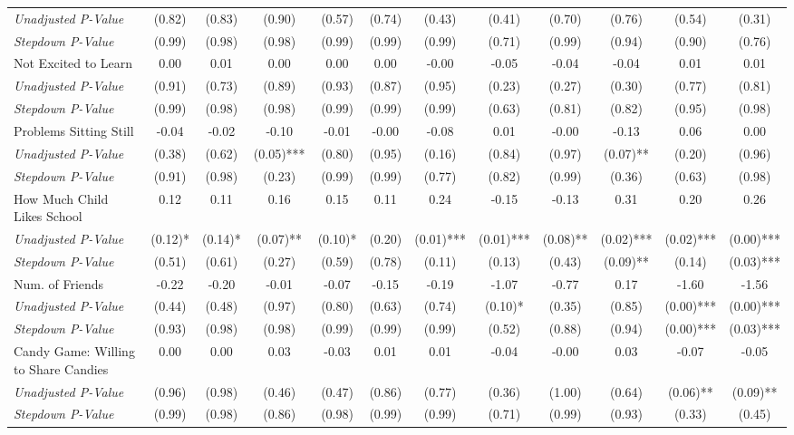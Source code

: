 \begin{tabular}{l c c c c c c c c c c c}
\quad \textit{Unadjusted P-Value} & (0.82) & (0.83) & (0.90) & (0.57) & (0.74) & (0.43) & (0.41) & (0.70) & (0.76) & (0.54) & (0.31) \\
\quad \textit{Stepdown P-Value} & (0.99) & (0.98) & (0.98) & (0.99) & (0.99) & (0.99) & (0.71) & (0.99) & (0.94) & (0.90) & (0.76) \\
Not Excited to Learn & 0.00 & 0.01 & 0.00 & 0.00 & 0.00 & -0.00 & -0.05 & -0.04 & -0.04 & 0.01 & 0.01 \\
\quad \textit{Unadjusted P-Value} & (0.91) & (0.73) & (0.89) & (0.93) & (0.87) & (0.95) & (0.23) & (0.27) & (0.30) & (0.77) & (0.81) \\
\quad \textit{Stepdown P-Value} & (0.99) & (0.98) & (0.98) & (0.99) & (0.99) & (0.99) & (0.63) & (0.81) & (0.82) & (0.95) & (0.98) \\
Problems Sitting Still & -0.04 & -0.02 & -0.10 & -0.01 & -0.00 & -0.08 & 0.01 & -0.00 & -0.13 & 0.06 & 0.00 \\
\quad \textit{Unadjusted P-Value} & (0.38) & (0.62) & (0.05)*** & (0.80) & (0.95) & (0.16) & (0.84) & (0.97) & (0.07)** & (0.20) & (0.96) \\
\quad \textit{Stepdown P-Value} & (0.91) & (0.98) & (0.23) & (0.99) & (0.99) & (0.77) & (0.82) & (0.99) & (0.36) & (0.63) & (0.98) \\
How Much Child Likes School & 0.12 & 0.11 & 0.16 & 0.15 & 0.11 & 0.24 & -0.15 & -0.13 & 0.31 & 0.20 & 0.26 \\
\quad \textit{Unadjusted P-Value} & (0.12)* & (0.14)* & (0.07)** & (0.10)* & (0.20) & (0.01)*** & (0.01)*** & (0.08)** & (0.02)*** & (0.02)*** & (0.00)*** \\
\quad \textit{Stepdown P-Value} & (0.51) & (0.61) & (0.27) & (0.59) & (0.78) & (0.11) & (0.13) & (0.43) & (0.09)** & (0.14) & (0.03)*** \\
Num. of Friends & -0.22 & -0.20 & -0.01 & -0.07 & -0.15 & -0.19 & -1.07 & -0.77 & 0.17 & -1.60 & -1.56 \\
\quad \textit{Unadjusted P-Value} & (0.44) & (0.48) & (0.97) & (0.80) & (0.63) & (0.74) & (0.10)* & (0.35) & (0.85) & (0.00)*** & (0.00)*** \\
\quad \textit{Stepdown P-Value} & (0.93) & (0.98) & (0.98) & (0.99) & (0.99) & (0.99) & (0.52) & (0.88) & (0.94) & (0.00)*** & (0.03)*** \\
Candy Game: Willing to Share Candies & 0.00 & 0.00 & 0.03 & -0.03 & 0.01 & 0.01 & -0.04 & -0.00 & 0.03 & -0.07 & -0.05 \\
\quad \textit{Unadjusted P-Value} & (0.96) & (0.98) & (0.46) & (0.47) & (0.86) & (0.77) & (0.36) & (1.00) & (0.64) & (0.06)** & (0.09)** \\
\quad \textit{Stepdown P-Value} & (0.99) & (0.98) & (0.86) & (0.98) & (0.99) & (0.99) & (0.71) & (0.99) & (0.93) & (0.33) & (0.45) \\
\bottomrule
\end{tabular}
